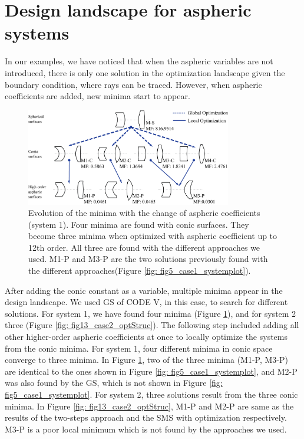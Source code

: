 \section{Design landscape for aspheric systems}
In our examples, we have noticed that when the aspheric variables are not introduced, there is only one solution in the optimization landscape given the boundary condition, where rays can be traced. However, when aspheric coefficients are added, new minima start to appear. 

\begin{figure}[h!]
    \centering
    \includegraphics[width=0.8\textwidth]{chapter-5/figures/Fig12_System1_structure.png}
    \caption{Evolution of the minima with the change of aspheric coefficients (system 1). Four minima are found with conic surfaces. They become three minima when optimized with aspheric coefficient up to 12th order. All three are found with the different approaches we used. M1-P and M3-P are the two solutions previously found with the different approaches(Figure \ref{fig: fig5_case1_systemplot}). }
    \label{fig: fig12_case1_optStruc}
\end{figure}

After adding the conic constant as a variable, multiple minima appear in the design landscape. We used GS of CODE V, in this case, to search for different solutions. For system 1, we have found four minima (Figure \ref{fig: fig12_case1_optStruc}), and for system 2 three (Figure \ref{fig: fig13_case2_optStruc}). 
The following step included adding all other higher-order aspheric coefficients at once to locally optimize the systems from the conic minima. For system 1, four different minima in conic space converge to three minima. In Figure \ref{fig: fig12_case1_optStruc}, two of the three minima (M1-P, M3-P) are identical to the ones shown in Figure \ref{fig: fig5_case1_systemplot}, and M2-P was also found by the GS, which is not shown in Figure \ref{fig: fig5_case1_systemplot}. For system 2, three solutions result from the three conic minima. In Figure \ref{fig: fig13_case2_optStruc}, M1-P and M2-P are same as the results of the two-steps approach and the SMS with optimization respectively. M3-P is a poor local minimum which is not found by the approaches we used.

